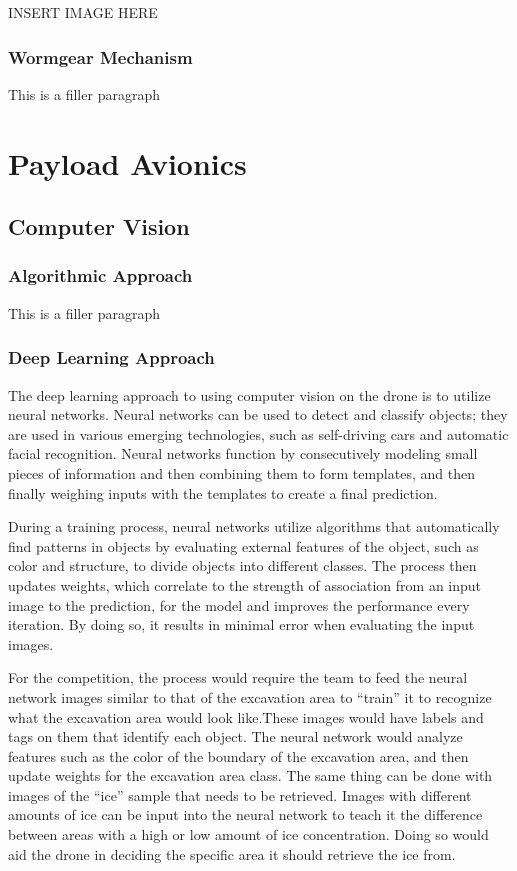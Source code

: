 			INSERT IMAGE HERE

		\subsubsection{Wormgear Mechanism}
			This is a filler paragraph

\section{Payload Avionics}\label{PL:Deployment:Avionics}
	\subsection{Computer Vision}
		\subsubsection{Algorithmic Approach}
			This is a filler paragraph

		\subsubsection{Deep Learning Approach}
		The deep learning approach to using computer vision on the drone is to utilize neural networks. Neural networks can be used to detect and classify objects; they are used in various emerging technologies, such as self-driving cars and automatic facial recognition. 
		Neural networks function by consecutively modeling small pieces of information and then combining them to form templates, and then finally weighing inputs with the templates to create a final prediction.
		
		During a training process, neural networks utilize algorithms that automatically find patterns in objects by evaluating external features of the object, such as color and structure, to divide objects into different classes. The process then updates weights, which correlate to the strength of association from an input image to the prediction, for the model and improves the performance every iteration. By doing so, it results in minimal error when evaluating the input images.
		
		For the competition, the process would require the team to feed the neural network images similar to that of the excavation area to “train” it to recognize what the excavation area would look like.These images would have labels and tags on them that identify each object. The neural network would analyze features such as the color of the boundary of the excavation area, and then update weights for the excavation area class. The same thing can be done with images of the “ice” sample that needs to be retrieved. Images with different amounts of ice can be input into the neural network to teach it the difference between areas with a high or low amount of ice concentration. Doing so would aid the drone in deciding the specific area it should retrieve the ice from.
		
